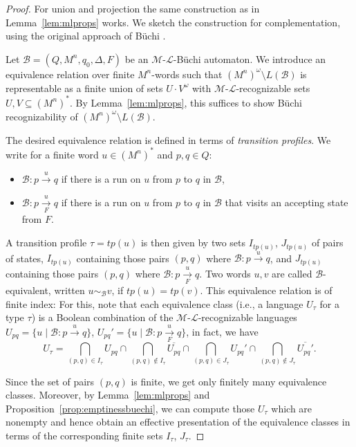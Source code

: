 \documentclass[copyright,creativecommons]{eptcs}
\theoremstyle{plain}
\theoremstyle{nonumberplain}
\newtheorem{proof}{Proof}
\newcommand{\m}{\ensuremath{\mathcal{M}}}
\newcommand{\el}{\ensuremath{\mathcal{L}}}
\newcommand{\ml}{\ensuremath{\m\textrm{-}\el}}
\newcommand{\tp}{\ensuremath{\mathit{tp}}}
\begin{document}
\begin{proof}
For union and projection the same construction as in Lemma~\ref{lem:mlprops} works. 
We sketch the construction for complementation, using the original 
approach of B\"uchi \cite{buc62}. 

Let $\mathcal{B} = (Q, M^n, q_0, \Delta, F)$ be an \ml-B\"uchi automaton.
We introduce an equivalence relation over finite $M^n$-words such that 
$(M^n)^\omega \setminus L(\mathcal{B})$ is representable as a finite union of 
sets $U \cdot V^\omega$ with \ml-recognizable sets $U,V \subseteq (M^n)^*$. 
By Lemma~\ref{lem:mlprops}, this suffices to show B\"uchi recognizability of $(M^n)^\omega \setminus L(\mathcal{B})$.

The desired equivalence relation is defined in terms of 
\emph{transition profiles}. We write for a finite word $u\in (M^n)^*$ and $p,q\in Q$: 
\begin{itemize}
 \item $\mathcal{B}: p \xrightarrow{u} q$ if there is a run on $u$ from $p$ to $q$ in $\mathcal{B}$,
 \item $\mathcal{B}: p \xrightarrow[F]{u} q$ if there is a run on $u$ from $p$ to $q$ in $\mathcal{B}$ that visits an accepting state from $F$.
\end{itemize}

A transition profile $\tau=\tp(u)$ is then given by two sets $I_{\tp(u)}$, $J_{\tp(u)}$ of pairs of states, $I_{\tp(u)}$ containing those pairs $(p,q)$ where $\mathcal{B}: p \xrightarrow{u} q$, and $J_{\tp(u)}$ containing those pairs $(p,q)$ where $\mathcal{B}: p \xrightarrow[F]{u} q$. Two words $u,v$ are called $\mathcal{B}$-equivalent, written $u \sim_\mathcal{B} v$, if $\tp(u) = \tp(v)$. This equivalence relation is of finite index: For this, note that each equivalence class (i.e., a language $U_\tau$ for a type $\tau$) is a Boolean combination of the $\ml$-recognizable languages 
$U_{pq}=\{u \mid \mathcal{B}:p \xrightarrow{u} q\}$, $U_{pq}'=\{u \mid \mathcal{B}:p \xrightarrow[F]{u} q\}$, in fact, we have
$$U_{\tau}=\bigcap_{(p,q)\in I_\tau} U_{pq} \cap \bigcap_{(p,q)\not\in I_\tau} \overline{U_{pq}} \cap \bigcap_{(p,q)\in J_\tau} U_{pq}' \cap \bigcap_{(p,q)\not\in J_\tau} \overline{U_{pq}'}.$$

Since the set of pairs $(p,q)$ is finite, we get only finitely many equivalence classes. Moreover, by Lemma~\ref{lem:mlprops} and Proposition~\ref{prop:emptinessbuechi}, we can compute those $U_\tau$ which are nonempty and hence obtain an effective presentation of the equivalence classes in terms of the corresponding finite sets $I_\tau$, $J_\tau$.


\end{proof}
\end{document}
